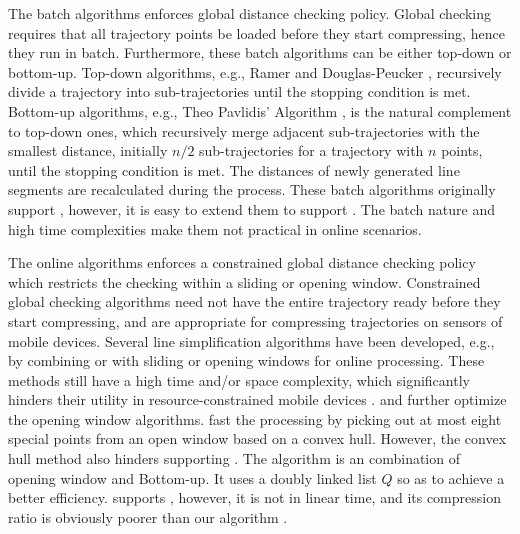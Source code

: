 The batch algorithms enforces global distance checking policy.
Global checking requires that all trajectory points be loaded before they start compressing, hence they run in batch.
Furthermore, these batch algorithms can be either top-down or bottom-up.
Top-down algorithms, e.g., Ramer \cite{Ramer:Split} and Douglas-Peucker \cite{Douglas:Peucker}, recursively divide a trajectory into sub-trajectories until the stopping condition is met.
%
Bottom-up algorithms, e.g., Theo Pavlidis' Algorithm \cite{Pavlidis:Segment}, is the natural complement to top-down ones, which recursively merge adjacent sub-trajectories with the smallest distance, initially $n/2$  sub-trajectories for a trajectory with $n$ points, until the stopping condition is met.
%
The distances of newly generated line segments are recalculated during the process.
%
These batch algorithms originally support \ped, however, it is easy to extend them to support \sed.
%
The batch nature and high time complexities make them not practical in online scenarios.


The online algorithms enforces a constrained global distance checking policy which restricts the checking within a sliding or opening window.
Constrained global checking algorithms need not have the entire trajectory ready before they start compressing, and are appropriate for compressing trajectories on sensors of mobile devices.
Several line simplification algorithms have been developed, e.g., by combining \dpa or \pavlidis with sliding or opening windows for online processing\cite{Meratnia:Spatiotemporal}. %
These methods still have a high time and/or space complexity, which significantly hinders their utility in resource-constrained mobile devices \cite{Liu:BQS}.
%
\bqsa \cite{Liu:BQS} and \squishe\cite{Muckell:Compression} further optimize the opening window algorithms.
%
\bqsa \cite{Liu:BQS} fast the processing by picking out at most eight special points from an open window based on a convex hull. However, the convex hull method also hinders \bqsa supporting \sed.
The \squishe\cite{Muckell:Compression} algorithm is an combination of {opening} window and Bottom-up. It uses a doubly linked list $Q$ so as to achieve a better efficiency. \squishe supports \sed, however, it is not in linear time, and its compression ratio is obviously poorer than our algorithm \cist.

